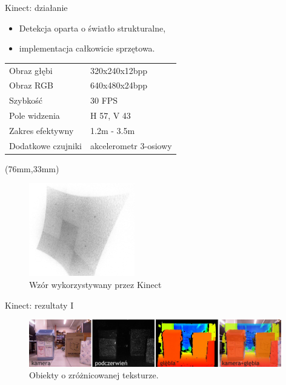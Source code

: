 \documentclass[xcolor=x11names,compress]{beamer}
\renewcommand{\(}{\begin{columns}}
\renewcommand{\)}{\end{columns}}
\newcommand{\<}[1]{\begin{column}{#1}}
\renewcommand{\>}{\end{column}}
\begin{document}
\begin{frame}{Kinect: działanie}

    \begin{itemize}
    \item Detekcja oparta o \alert{światło strukturalne},
    \item implementacja całkowicie sprzętowa.
    \end{itemize}

    \vspace{.6cm}

    \begin{tabular}{ll}
    \alert{Obraz głębi} & 320x240x12bpp\\
    \alert{Obraz RGB} & 640x480x24bpp\\
    \alert{Szybkość} & 30 FPS\\
    \alert{Pole widzenia} & H 57, V 43\\
    \alert{Zakres efektywny} & 1.2m - 3.5m\\
    \alert{Dodatkowe czujniki} & akcelerometr 3-osiowy\\
    \end{tabular}

    \begin{textblock*}{50mm}(76mm,33mm)%
    \begin{minipage}[l]{50mm}%

    \begin{figure}[h!]
    \centering
    \includegraphics[width=4.6cm]{../Common/img/kinect_pattern}
    \caption{Wzór wykorzystywany przez Kinect}
    \end{figure}

    \end{minipage}
\end{textblock*}

\end{frame}


\begin{frame}{Kinect: rezultaty I}

    \begin{figure}[h!]
    \centering
    \includegraphics[width=11cm]{../Common/img/kinect_2}
    \caption{Obiekty o zróżnicowanej teksturze.}
    \end{figure}

\end{frame}
\end{document}
